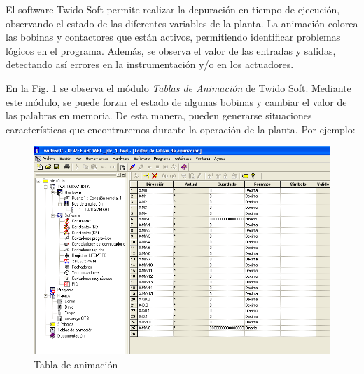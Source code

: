 El software Twido Soft permite realizar la depuración
en tiempo de ejecución, observando el estado de las diferentes variables
de la planta.
La animación colorea las bobinas y contactores que están activos, permitiendo
identificar problemas lógicos en el programa.
Además, se observa el valor de las entradas y salidas, detectando así
errores en la instrumentación y/o en los actuadores.

En la Fig. \ref{img:twidosoftdebug} se observa el módulo \emph{Tablas
de Animación} de Twido Soft.
Mediante este módulo, se puede forzar el estado de algunas bobinas y cambiar el
valor de las palabras en memoria.
De esta manera, pueden generarse situaciones características que
encontraremos durante la
operación de la planta.
Por ejemplo:

\begin{figure}[ht]
	\centering
	\includegraphics[width=.8\textwidth]
	{Cap4-ProgramacionPLC/images/twidosoftdebug.png}
	\caption{Tabla de animación}
	\label{img:twidosoftdebug}
\end{figure}

